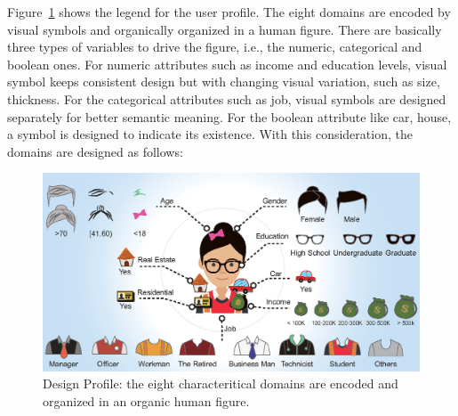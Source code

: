 Figure~\ref{fig:design_profile} shows the legend for the user profile. The eight domains are encoded by visual symbols and organically organized in a human figure. There are basically three types of variables to drive the figure, i.e., the numeric, categorical and boolean ones. For numeric attributes such as income and education levels, visual symbol keeps consistent design but with changing visual variation, such as size, thickness. For the categorical attributes such as job, visual symbols are designed separately for better semantic meaning. For the boolean attribute like car, house, a symbol is designed to indicate its existence. With this consideration, the domains are designed as follows:

\begin{figure}[htb!]
 \centering %
 \includegraphics[width=\columnwidth]{pictures/design_profile}
 \caption{Design Profile: the eight characteritical domains are encoded and organized in an organic human figure.}
 \label{fig:design_profile}
\end{figure}



